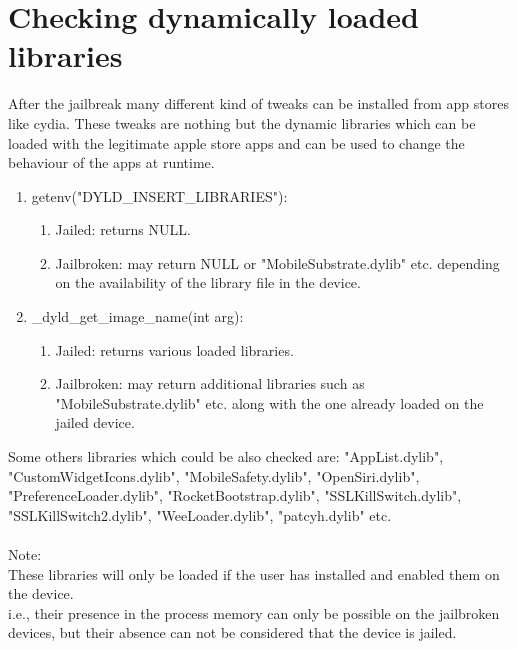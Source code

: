 \section{Checking dynamically loaded libraries}
\vspace{20px}
After the jailbreak many different kind of tweaks can be installed from app stores like cydia. 
These tweaks are nothing but the dynamic libraries which can be loaded with the legitimate apple store apps and can be used to change the behaviour of the apps at runtime.
\begin{enumerate}
	\item getenv("DYLD\_INSERT\_LIBRARIES"):

	\begin{enumerate}
		\item Jailed: returns NULL.
		\item Jailbroken: may return NULL or "MobileSubstrate.dylib" etc. depending on the availability of the library file in the device.
	\end{enumerate}

	\item \_dyld\_get\_image\_name(int arg):

	\begin{enumerate}
		\item Jailed: returns various loaded libraries.
		\item Jailbroken: may return additional libraries such as "MobileSubstrate.dylib" etc. along with the one already loaded on the jailed device.
	\end{enumerate}

\end{enumerate}
Some others libraries which could be also checked are: "AppList.dylib", "CustomWidgetIcons.dylib", "MobileSafety.dylib", "OpenSiri.dylib", "PreferenceLoader.dylib", "RocketBootstrap.dylib", "SSLKillSwitch.dylib", "SSLKillSwitch2.dylib", "WeeLoader.dylib", "patcyh.dylib" etc.\\\\
Note:\\ 
These libraries will only be loaded if the user has installed and enabled them on the device.\\
i.e., their presence in the process memory can only be possible on the jailbroken devices, but their absence can not be considered that the device is jailed.


\newpage
